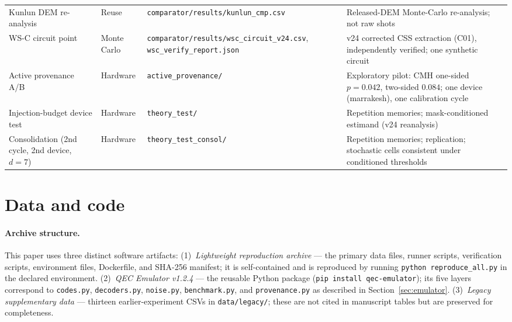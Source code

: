 \documentclass[11pt,a4paper]{article}
\begin{document}
\begin{longtable}{@{}>{\raggedright\arraybackslash}p{3.4cm}>{\raggedright\arraybackslash}p{1.6cm}>{\raggedright\arraybackslash}p{4.6cm}>{\raggedright\arraybackslash}p{4.4cm}@{}}
Kunlun DEM re-analysis & Reuse & \texttt{comparator/\allowbreak results/\allowbreak kunlun\_\allowbreak cmp.csv} & Released-DEM Monte-Carlo re-analysis; not raw shots \\
WS-C circuit point & Monte Carlo & \texttt{comparator/\allowbreak results/\allowbreak wsc\_\allowbreak circuit\_\allowbreak v24.csv}, \texttt{wsc\_\allowbreak verify\_\allowbreak report.json} & v24 corrected CSS extraction (C01), independently verified; one synthetic circuit \\
Active provenance A/B & Hardware & \texttt{active\_\allowbreak provenance/\allowbreak } & Exploratory pilot: CMH one-sided $p{=}0.042$, two-sided $0.084$; one device (marrakesh), one calibration cycle \\
Injection-budget device test & Hardware & \texttt{theory\_\allowbreak test/\allowbreak } & Repetition memories; mask-conditioned estimand (v24 reanalysis) \\
Consolidation (2nd cycle, 2nd device, $d{=}7$) & Hardware & \texttt{theory\_\allowbreak test\_\allowbreak consol/\allowbreak } & Repetition memories; replication; stochastic cells consistent under conditioned thresholds \\
\end{longtable}
\endgroup

\section*{Data and code}

\paragraph{Archive structure.}
This paper uses three distinct software artifacts:
(1)~\emph{Lightweight reproduction archive} --- the primary data files, runner scripts, verification scripts, environment files, Dockerfile, and SHA-256 manifest; it is self-contained and is reproduced by running \texttt{python reproduce\_all.py} in the declared environment.
(2)~\emph{QEC Emulator v1.2.4} --- the reusable Python package (\texttt{pip install qec-emulator});
its five layers correspond to \texttt{codes.py}, \texttt{decoders.py}, \texttt{noise.py},
\texttt{benchmark.py}, and \texttt{provenance.py} as described in Section~\ref{sec:emulator}.
(3)~\emph{Legacy supplementary data} --- thirteen earlier-experiment CSVs
in \texttt{data/legacy/}; these are not cited in manuscript tables but are
preserved for completeness.
\end{document}
